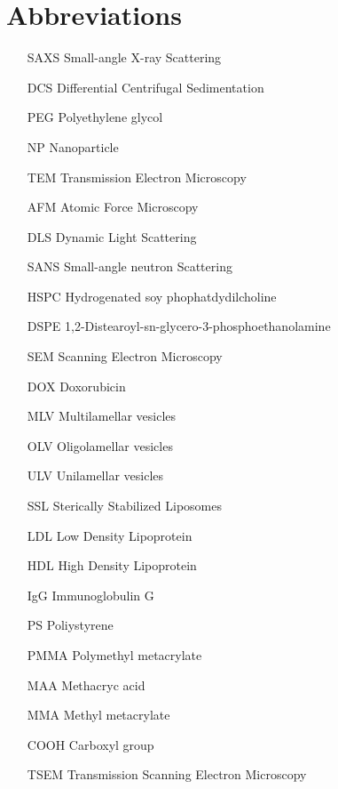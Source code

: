 \section*{Abbreviations}

\begin{itemize}
        \item   [SAXS] Small-angle X-ray Scattering
        \item   [DCS] Differential Centrifugal Sedimentation
        \item   [PEG] Polyethylene glycol
        \item   [NP] Nanoparticle
        \item   [TEM] Transmission Electron Microscopy
        \item   [AFM] Atomic Force Microscopy
        \item   [DLS] Dynamic Light Scattering
        \item   [SANS] Small-angle neutron Scattering
        \item   [HSPC] Hydrogenated soy phophatdydilcholine
        \item   [DSPE] 1,2-Distearoyl-sn-glycero-3-phosphoethanolamine
        \item   [SEM] Scanning Electron Microscopy
        \item   [DOX] Doxorubicin        
        \item   [MLV] Multilamellar vesicles
        \item   [OLV] Oligolamellar vesicles
        \item   [ULV] Unilamellar vesicles
        \item   [SSL] Sterically Stabilized Liposomes
        \item   [LDL] Low Density Lipoprotein
        \item   [HDL] High Density Lipoprotein
        \item   [IgG] Immunoglobulin G
        \item   [PS] Poliystyrene
        \item   [PMMA] Polymethyl metacrylate
        \item   [MAA] Methacryc acid
        \item   [MMA] Methyl metacrylate        
        \item   [COOH] Carboxyl group
        \item   [TSEM] Transmission Scanning Electron Microscopy
        

\end{itemize}

\cleardoublepage
